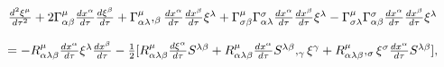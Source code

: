 \begin{equation}
\begin{array}{c}
\frac{d^{2}\xi ^{\mu }}{d\tau ^{2}}+2\Gamma _{\alpha \beta }^{\mu }\frac{%
dx^{\alpha }}{d\tau }\frac{d\xi ^{\beta }}{d\tau }+\Gamma _{\alpha \lambda
}^{\mu },_{\beta }\frac{dx^{\alpha }}{d\tau }\frac{dx^{\beta }}{d\tau }\xi
^{\lambda }+\Gamma _{\sigma \beta }^{\mu }\Gamma _{\alpha \lambda }^{\sigma }%
\frac{dx^{\alpha }}{d\tau }\frac{dx^{\beta }}{d\tau }\xi ^{\lambda }-\Gamma
_{\sigma \lambda }^{\mu }\Gamma _{\alpha \beta }^{\sigma }\frac{dx^{\alpha }%
}{d\tau }\frac{dx^{\beta }}{d\tau }\xi ^{\lambda } \\ 
\\ 
=-R_{\alpha \lambda \beta }^{\mu }\frac{dx^{\alpha }}{d\tau }\xi ^{\lambda }%
\frac{dx^{\beta }}{d\tau }-\frac{1}{2}[R_{\alpha \lambda \beta }^{\mu }\frac{%
d\xi ^{\alpha }}{d\tau }S^{\lambda \beta }+R_{\alpha \lambda \beta }^{\mu }%
\frac{dx^{\alpha }}{d\tau }S^{\lambda \beta },_{\gamma }\xi ^{\gamma
}+R_{\alpha \lambda \beta }^{\mu },_{\sigma }\xi ^{\sigma }\frac{dx^{\alpha }%
}{d\tau }S^{\lambda \beta }],
\end{array}
\label{24}
\end{equation}


